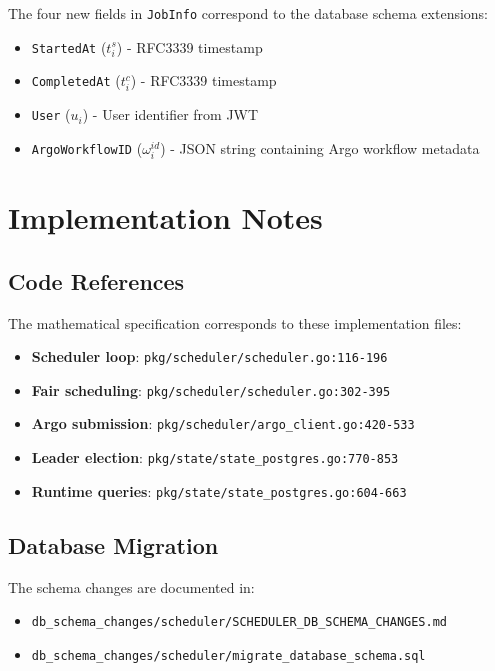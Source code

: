 \documentclass[11pt]{article}
\begin{document}
The four new fields in \texttt{JobInfo} correspond to the database schema extensions:
\begin{itemize}
\item \texttt{StartedAt} ($t_i^s$) - RFC3339 timestamp
\item \texttt{CompletedAt} ($t_i^c$) - RFC3339 timestamp
\item \texttt{User} ($u_i$) - User identifier from JWT
\item \texttt{ArgoWorkflowID} ($\omega_i^{id}$) - JSON string containing Argo workflow metadata
\end{itemize}

\section{Implementation Notes}

\subsection{Code References}

The mathematical specification corresponds to these implementation files:

\begin{itemize}
\item \textbf{Scheduler loop}: \texttt{pkg/scheduler/scheduler.go:116-196}
\item \textbf{Fair scheduling}: \texttt{pkg/scheduler/scheduler.go:302-395}
\item \textbf{Argo submission}: \texttt{pkg/scheduler/argo\_client.go:420-533}
\item \textbf{Leader election}: \texttt{pkg/state/state\_postgres.go:770-853}
\item \textbf{Runtime queries}: \texttt{pkg/state/state\_postgres.go:604-663}
\end{itemize}

\subsection{Database Migration}

The schema changes are documented in:
\begin{itemize}
\item \texttt{db\_schema\_changes/scheduler/SCHEDULER\_DB\_SCHEMA\_CHANGES.md}
\item \texttt{db\_schema\_changes/scheduler/migrate\_database\_schema.sql}
\end{itemize}
\end{document}
